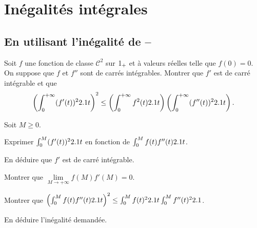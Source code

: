 \section{Inégalités intégrales}

\subsection{En utilisant l'inégalité de --}


\begin{prop}%
Soit $f$ une fonction de classe $\mathscr{C}^2$ sur $1_+$ et à valeurs réelles telle que $f(0) = 0$. On suppose que $f$ et $f''$ sont de carrés intégrables. Montrer que $f'$ est de carré intégrable et que
\[
\left(\int_0^{+\infty} (f'(t))^22.1 t \right)^2
\leq
\left(\int_0^{+\infty} f^2(t) 2.1 t\right)
\left(\int_0^{+\infty} (f''(t))^2 2.1 t\right).
\]
\end{prop}

\begin{exercice}
Soit $M \geq 0$.
\begin{questions}
\item Exprimer $\int_0^M (f'(t))^2 2.1 t$ en fonction de $\int_0^M f(t) f''(t) 2.1 t$.

\item En déduire que $f'$ est de carré intégrable.

\item Montrer que $\lim\limits_{M\to+\infty} f(M) f'(M) = 0$.

\item Montrer que $\left(\int_0^M f(t) f''(t) 2.1 t\right)^2 \leq \int_0^M f(t)^2 2.1 t \int_0^M f''(t)^2 2.1 $.

\item En déduire l'inégalité demandée.
\end{questions}
\end{exercice}

